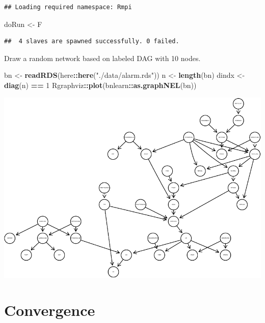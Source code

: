 \documentclass[
]{article}
\newenvironment{Shaded}{\begin{snugshade}}{\end{snugshade}}
\newcommand{\DecValTok}[1]{\textcolor[rgb]{0.00,0.00,0.81}{#1}}
\newcommand{\FunctionTok}[1]{\textcolor[rgb]{0.13,0.29,0.53}{\textbf{#1}}}
\newcommand{\NormalTok}[1]{#1}
\newcommand{\OtherTok}[1]{\textcolor[rgb]{0.56,0.35,0.01}{#1}}
\newcommand{\SpecialCharTok}[1]{\textcolor[rgb]{0.81,0.36,0.00}{\textbf{#1}}}
\newcommand{\StringTok}[1]{\textcolor[rgb]{0.31,0.60,0.02}{#1}}
\begin{document}
\begin{verbatim}
## Loading required namespace: Rmpi
\end{verbatim}

\begin{Shaded}
\begin{Highlighting}[]
\NormalTok{doRun }\OtherTok{\textless{}{-}}\NormalTok{ F}
\end{Highlighting}
\end{Shaded}

\begin{verbatim}
##  4 slaves are spawned successfully. 0 failed.
\end{verbatim}

Draw a random network based on labeled DAG with 10 nodes.

\begin{Shaded}
\begin{Highlighting}[]
\NormalTok{bn }\OtherTok{\textless{}{-}} \FunctionTok{readRDS}\NormalTok{(here}\SpecialCharTok{::}\FunctionTok{here}\NormalTok{(}\StringTok{"./data/alarm.rds"}\NormalTok{))}
\NormalTok{n  }\OtherTok{\textless{}{-}} \FunctionTok{length}\NormalTok{(bn)}
\NormalTok{dindx }\OtherTok{\textless{}{-}} \FunctionTok{diag}\NormalTok{(n) }\SpecialCharTok{==} \DecValTok{1}
\NormalTok{Rgraphviz}\SpecialCharTok{::}\FunctionTok{plot}\NormalTok{(bnlearn}\SpecialCharTok{::}\FunctionTok{as.graphNEL}\NormalTok{(bn))}
\end{Highlighting}
\end{Shaded}

\includegraphics{simulation_bn_files/figure-latex/unnamed-chunk-2-1.pdf}

\hypertarget{convergence}{%
\section{Convergence}\label{convergence}}
\end{document}
